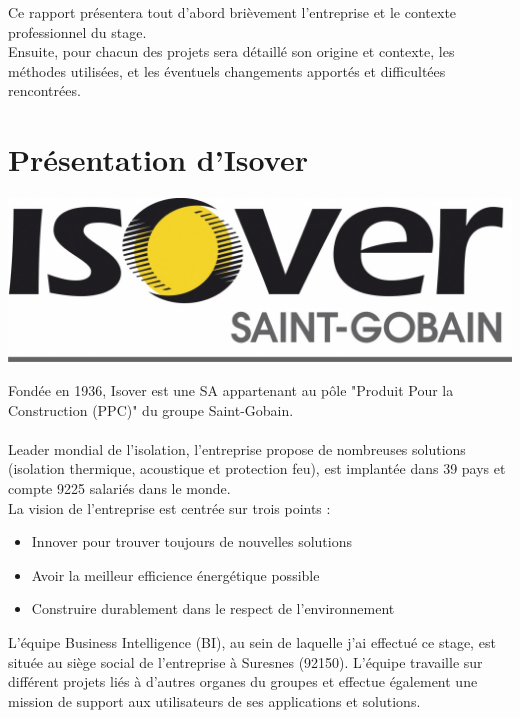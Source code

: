 \documentclass[a4paper,12pt]{article}
\begin{document}
Ce rapport présentera tout d'abord brièvement l'entreprise et le contexte professionnel du stage.\\
\indent Ensuite, pour chacun des projets sera détaillé son origine et contexte, les méthodes utilisées, et les éventuels changements apportés et difficultées rencontrées.


\newpage
{}
\section*{Présentation d'Isover}
\begin{center}
    \includegraphics[scale=0.15]{illustrations/isover-logo}		
\end{center}
Fondée en 1936, Isover est une SA appartenant au pôle "Produit Pour la Construction (PPC)" du groupe Saint-Gobain.\\ \\

Leader mondial de l'isolation, l'entreprise propose de nombreuses solutions (isolation thermique, acoustique et protection feu), est implantée dans 39 pays et compte 9225 salariés dans le monde.\\

La vision de l'entreprise est centrée sur trois points :
\begin{itemize}
    \item Innover pour trouver toujours de nouvelles solutions
    \item Avoir la meilleur efficience énergétique possible
    \item Construire durablement dans le respect de l'environnement \\
\end{itemize}

\noindent L'équipe Business Intelligence (BI), au sein de laquelle j'ai effectué ce stage, est située au siège social de l'entreprise à Suresnes (92150). L'équipe travaille sur différent projets liés à d'autres organes du groupes et effectue également une mission de support aux utilisateurs de ses applications et solutions. \\ \\
\end{document}
